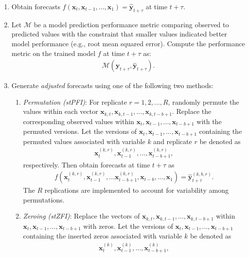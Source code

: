\documentclass[AMS,STIX2COL]{WileyNJD-v2}
\begin{document}
\begin{enumerate}
    \item Obtain forecasts $f(\textbf{x}_t, \textbf{x}_{t-1},..., \textbf{x}_{1})=\hat{\textbf{y}}_{t+\tau}$ at time $t+\tau$.
    \item Let $\mathcal{M}$ be a model prediction performance metric comparing observed to predicted values with the constraint that smaller values indicated better model performance (e.g., root mean squared error). Compute the performance metric on the trained model $f$ at time $t+\tau$ as: 
    \begin{align}
        \mathcal{M}\left(\textbf{y}_{t+\tau}, \hat{\textbf{y}}_{t+\tau}\right).
    \end{align}
    \item Generate \emph{adjusted} forecasts using one of the following two methods:
    \begin{enumerate}
        \item \emph{Permutation (stPFI)}: For replicate $r=1,2,...,R$, randomly permute the values within each vector
        $\textbf{x}_{k,t}, \textbf{x}_{k,t-1},..., \textbf{x}_{k,t-b+1}$. Replace the corresponding observed values within $\textbf{x}_t, \textbf{x}_{t-1},...,\textbf{x}_{t-b+1}$ with the permuted versions. Let the versions of $\textbf{x}_t, \textbf{x}_{t-1},...,\textbf{x}_{t-b+1}$ containing the permuted values associated with variable $k$ and replicate $r$ be denoted as
        \begin{align}
            \textbf{x}^{(k,r)}_t, \textbf{x}^{(k,r)}_{t-1},..., \textbf{x}^{(k,r)}_{t-b+1},
        \end{align}
        respectively. Then obtain forecasts at time $t+\tau$ as
        \begin{align}
            f\left(\textbf{x}^{(k,r)}_t, \textbf{x}^{(k,r)}_{t-1},... \textbf{x}^{(k,r)}_{t-b+1}, \textbf{x}_{t-b},..., \textbf{x}_{1}\right)=\hat{\textbf{y}}^{(k,b,r)}_{t+\tau}.
        \end{align}
        The $R$ replications are implemented to account for variability among permutations.
        \item \emph{Zeroing (stZFI)}: Replace the vectors of $\textbf{x}_{k,t}, \textbf{x}_{k,t-1},..., \textbf{x}_{k,t-b+1}$ within $\textbf{x}_t, \textbf{x}_{t-1},...,\textbf{x}_{t-b+1}$ with zeros. Let the versions of $\textbf{x}_t, \textbf{x}_{t-1},...,\textbf{x}_{t-b+1}$ containing the inserted zeros associated with variable $k$ be denoted as
        \begin{align}
            \textbf{x}^{(k)}_t, \textbf{x}^{(k)}_{t-1},..., \textbf{x}^{(k)}_{t-b+1},

\end{align}
\end{enumerate}
\end{enumerate}
\end{document}
